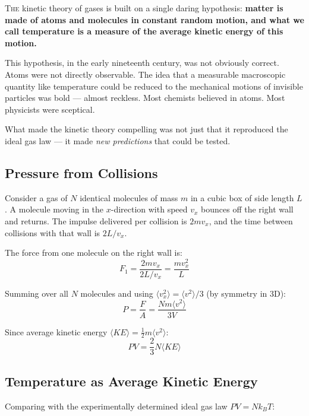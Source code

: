 \documentclass[12pt, a4paper, twoside]{book}
\begin{document}
\lettrine[lines=3,loversize=0.08]{\textcolor{accent}{T}}{he} kinetic theory of gases is built on a single daring hypothesis: \textbf{matter is made of atoms and molecules in constant random motion, and what we call temperature is a measure of the average kinetic energy of this motion.}

This hypothesis, in the early nineteenth century, was not obviously correct. Atoms were not directly observable. The idea that a measurable macroscopic quantity like temperature could be reduced to the mechanical motions of invisible particles was bold --- almost reckless. Most chemists believed in atoms. Most physicists were sceptical.

What made the kinetic theory compelling was not just that it reproduced the ideal gas law --- it made \textit{new predictions} that could be tested.

\subsection{Pressure from Collisions}

Consider a gas of $N$ identical molecules of mass $m$ in a cubic box of side length $L$. A molecule moving in the $x$-direction with speed $v_x$ bounces off the right wall and returns. The impulse delivered per collision is $2mv_x$, and the time between collisions with that wall is $2L/v_x$.

The force from one molecule on the right wall is:
\begin{equation}
  F_1 = \frac{2mv_x}{2L/v_x} = \frac{mv_x^2}{L}
\end{equation}

Summing over all $N$ molecules and using $\langle v_x^2 \rangle = \langle v^2\rangle/3$ (by symmetry in 3D):
\begin{equation}
  P = \frac{F}{A} = \frac{Nm\langle v^2\rangle}{3V}
\end{equation}

Since average kinetic energy $\langle KE\rangle = \frac{1}{2}m\langle v^2\rangle$:
\begin{equation}
  \boxed{PV = \frac{2}{3}N\langle KE\rangle}
\end{equation}

\subsection{Temperature as Average Kinetic Energy}

Comparing with the experimentally determined ideal gas law $PV = Nk_BT$:
\end{document}

